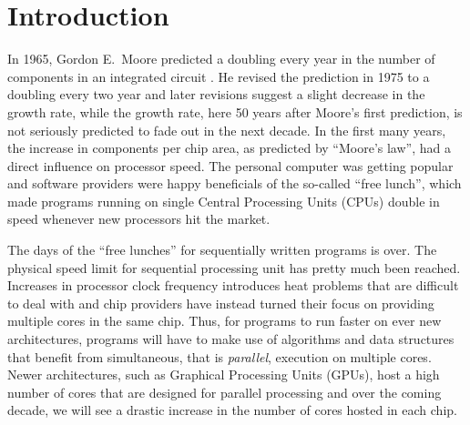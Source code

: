 \documentclass[oneside,11pt]{book}
\begin{document}
\chapter{Introduction}
In 1965, Gordon E.\ Moore predicted a doubling every year in the
number of components in an integrated circuit \cite{moore1965}. He
revised the prediction in 1975 to a doubling every two year
\cite{moore1975} and later revisions suggest a slight decrease in the
growth rate, while the growth rate, here 50 years after Moore's first
prediction, is not seriously predicted to fade out in the next
decade. In the first many years, the increase in components per chip
area, as predicted by ``Moore's law'', had a direct influence on
processor speed. The personal computer was getting popular and
software providers were happy beneficials of the so-called ``free
lunch'', which made programs running on single Central Processing
Units (CPUs) double in speed whenever new processors hit the market.

The days of the ``free lunches'' for sequentially written programs is
over. The physical speed limit for sequential processing unit has
pretty much been reached. Increases in processor clock frequency
introduces heat problems that are difficult to deal with and chip
providers have instead turned their focus on providing multiple cores in the
same chip. Thus, for programs to run faster on ever new
architectures, programs will have to make use of algorithms and data
structures that benefit from simultaneous, that is \emph{parallel},
execution on multiple cores. Newer architectures, such as Graphical
Processing Units (GPUs), host a high number of cores that are designed
for parallel processing and over the coming decade, we will see a
drastic increase in the number of cores hosted in each chip.
\end{document}
